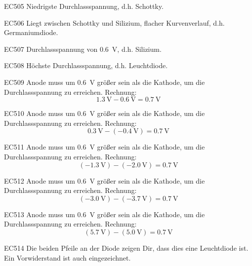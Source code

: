 \begin{sol}{EC505}
 Niedrigste Durchlassspannung, d.h. Schottky.
\end{sol}


\begin{sol}{EC506}
 Liegt zwischen Schottky und Silizium, flacher Kurvenverlauf, d.h. Germaniumdiode.
\end{sol}

\begin{sol}{EC507}
  Durchlassspannung von \SI{0.6}{\volt}, d.h. Silizium.
\end{sol}

\begin{sol}{EC508}
Höchste Durchlassspannung, d.h. Leuchtdiode.
\end{sol}

\begin{sol}{EC509}
Anode muss um \SI{0.6}{\volt} größer sein als die Kathode, um die Durchlassspannung zu erreichen.
Rechnung: $$ \SI{1.3}{\volt} - \SI{0.6}{\volt} = \SI{0.7}{\volt} $$
\end{sol}

\begin{sol}{EC510}
Anode muss um \SI{0.6}{\volt} größer sein als die Kathode, um die Durchlassspannung zu erreichen.
Rechnung: $$ 
\SI{0.3}{\volt} - 
(\SI{-0.4}{\volt} )
 = \SI{0.7}{\volt} $$
\end{sol}

\begin{sol}{EC511}
Anode muss um \SI{0.6}{\volt} größer sein als die Kathode, um die Durchlassspannung zu erreichen.
Rechnung: $$ 
(\SI{-1.3}{\volt} )- 
(\SI{-2.0}{\volt} )
 = \SI{0.7}{\volt} $$
\end{sol}

\begin{sol}{EC512}
Anode muss um \SI{0.6}{\volt} größer sein als die Kathode, um die Durchlassspannung zu erreichen.
Rechnung: $$ 
(\SI{-3.0}{\volt} )- 
(\SI{-3.7}{\volt} )
 = \SI{0.7}{\volt} $$
\end{sol}

\begin{sol}{EC513}
Anode muss um \SI{0.6}{\volt} größer sein als die Kathode, um die Durchlassspannung zu erreichen.
Rechnung: $$ 
(\SI{5.7}{\volt} )- 
(\SI{5.0}{\volt} )
 = \SI{0.7}{\volt} $$
\end{sol}


\begin{sol}{EC514}
Die beiden Pfeile an der Diode zeigen Dir, dass dies eine Leuchtdiode ist.  Ein Vorwiderstand ist auch eingezeichnet.
\end{sol}


